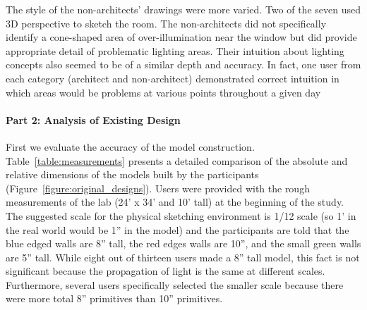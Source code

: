 The style of the non-architects' drawings were more varied. Two of the
seven used 3D perspective to sketch the room.  The non-architects did
not specifically identify a cone-shaped area of over-illumination near
the window but did provide appropriate detail of problematic lighting
areas.  Their intuition about lighting concepts also seemed to be of a
similar depth and accuracy.  In fact, one user from each category
(architect and non-architect) demonstrated correct intuition in which
areas would be problems at various points throughout a given day




\paragraph{Part 2: Analysis of Existing Design}

First we evaluate the accuracy of the model construction.
Table~\ref{table:measurements} presents a detailed comparison of the
absolute and relative dimensions of the models built by the
participants (Figure~\ref{figure:original_designs}).
%
Users were provided with the rough measurements of the lab (24' x 34'
and 10' tall) at the beginning of the study.  The suggested scale for
the physical sketching environment is 1/12 scale (so 1' in the real
world would be 1'' in the model) and the participants are told that
the blue edged walls are 8'' tall, the red edges walls are 10'', and
the small green walls are 5'' tall.
%
While eight out of thirteen users made a 8'' tall model, this fact is
not significant because the propagation of light is the same at
different scales.  Furthermore, several users specifically selected
the smaller scale because there were more total 8'' primitives than
10'' primitives.
%

